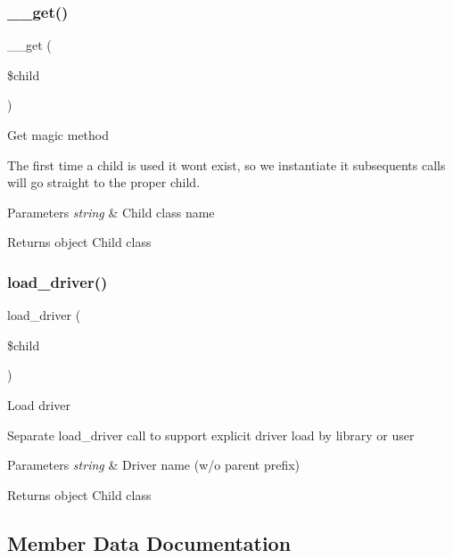 \subsubsection{\texorpdfstring{\+\_\+\+\_\+get()}{\_\_get()}}
{\footnotesize\ttfamily \+\_\+\+\_\+get (\begin{DoxyParamCaption}\item[{}]{\$child }\end{DoxyParamCaption})}

Get magic method

The first time a child is used it won\textquotesingle{}t exist, so we instantiate it subsequents calls will go straight to the proper child.


\begin{DoxyParams}{Parameters}
{\em string} & Child class name \\
\hline
\end{DoxyParams}
\begin{DoxyReturn}{Returns}
object Child class 
\end{DoxyReturn}
\mbox{\label{class_c_i___driver___library_a7cc2908487e106164664ef7d743690b8}} 
\subsubsection{\texorpdfstring{load\+\_\+driver()}{load\_driver()}}
{\footnotesize\ttfamily load\+\_\+driver (\begin{DoxyParamCaption}\item[{}]{\$child }\end{DoxyParamCaption})}

Load driver

Separate load\+\_\+driver call to support explicit driver load by library or user


\begin{DoxyParams}{Parameters}
{\em string} & Driver name (w/o parent prefix) \\
\hline
\end{DoxyParams}
\begin{DoxyReturn}{Returns}
object Child class 
\end{DoxyReturn}


\subsection{Member Data Documentation}
\mbox{\label{class_c_i___driver___library_ab820c27413d5904686c58f6b2941b603}} 
